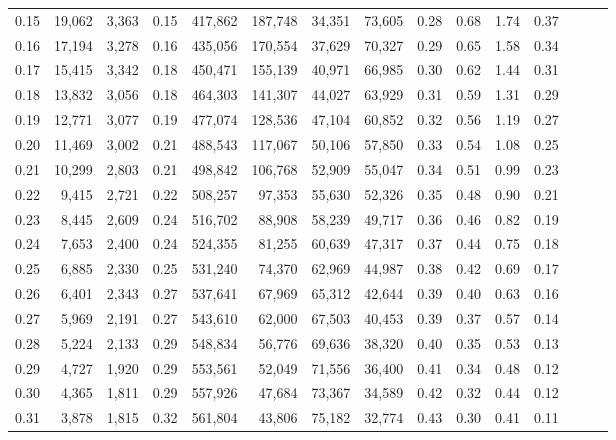 \begin{tabular}{rrrrrrrrrrrrrrr}
0.15 &  19,062 &  3,363 &  0.15 &  417,862 &  187,748 &   34,351 &   73,605 &  0.28 &  0.68 &  1.74 &      0.37 \\
0.16 &  17,194 &  3,278 &  0.16 &  435,056 &  170,554 &   37,629 &   70,327 &  0.29 &  0.65 &  1.58 &      0.34 \\
0.17 &  15,415 &  3,342 &  0.18 &  450,471 &  155,139 &   40,971 &   66,985 &  0.30 &  0.62 &  1.44 &      0.31 \\
0.18 &  13,832 &  3,056 &  0.18 &  464,303 &  141,307 &   44,027 &   63,929 &  0.31 &  0.59 &  1.31 &      0.29 \\
0.19 &  12,771 &  3,077 &  0.19 &  477,074 &  128,536 &   47,104 &   60,852 &  0.32 &  0.56 &  1.19 &      0.27 \\
0.20 &  11,469 &  3,002 &  0.21 &  488,543 &  117,067 &   50,106 &   57,850 &  0.33 &  0.54 &  1.08 &      0.25 \\
0.21 &  10,299 &  2,803 &  0.21 &  498,842 &  106,768 &   52,909 &   55,047 &  0.34 &  0.51 &  0.99 &      0.23 \\
0.22 &   9,415 &  2,721 &  0.22 &  508,257 &   97,353 &   55,630 &   52,326 &  0.35 &  0.48 &  0.90 &      0.21 \\
0.23 &   8,445 &  2,609 &  0.24 &  516,702 &   88,908 &   58,239 &   49,717 &  0.36 &  0.46 &  0.82 &      0.19 \\
0.24 &   7,653 &  2,400 &  0.24 &  524,355 &   81,255 &   60,639 &   47,317 &  0.37 &  0.44 &  0.75 &      0.18 \\
0.25 &   6,885 &  2,330 &  0.25 &  531,240 &   74,370 &   62,969 &   44,987 &  0.38 &  0.42 &  0.69 &      0.17 \\
0.26 &   6,401 &  2,343 &  0.27 &  537,641 &   67,969 &   65,312 &   42,644 &  0.39 &  0.40 &  0.63 &      0.16 \\
0.27 &   5,969 &  2,191 &  0.27 &  543,610 &   62,000 &   67,503 &   40,453 &  0.39 &  0.37 &  0.57 &      0.14 \\
0.28 &   5,224 &  2,133 &  0.29 &  548,834 &   56,776 &   69,636 &   38,320 &  0.40 &  0.35 &  0.53 &      0.13 \\
0.29 &   4,727 &  1,920 &  0.29 &  553,561 &   52,049 &   71,556 &   36,400 &  0.41 &  0.34 &  0.48 &      0.12 \\
0.30 &   4,365 &  1,811 &  0.29 &  557,926 &   47,684 &   73,367 &   34,589 &  0.42 &  0.32 &  0.44 &      0.12 \\
0.31 &   3,878 &  1,815 &  0.32 &  561,804 &   43,806 &   75,182 &   32,774 &  0.43 &  0.30 &  0.41 &      0.11 \\

\end{tabular}
